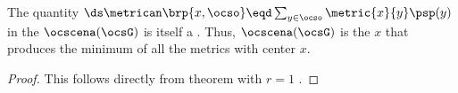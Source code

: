\begin{remark}
The quantity $\ds\metrican\brp{x,\ocso}\eqd \sum_{y\in\ocso}\metric{x}{y}\psp(y)$
in the  $\ocscena(\ocsG)$ 
is itself a  .
Thus, $\ocscena(\ocsG)$ is the $x$ that produces the minimum of all the metrics with center $x$.
\end{remark}
\begin{proof}
This follows directly from  theorem with $r=1$ .
\end{proof}

%

